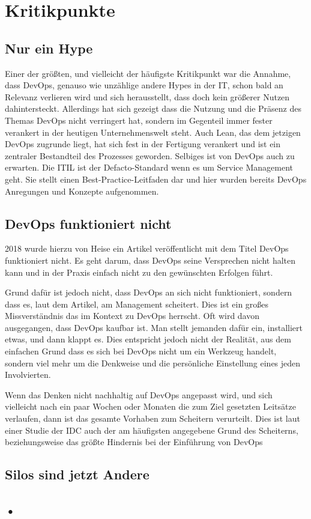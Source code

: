 \section{Kritikpunkte}

\subsection{Nur ein Hype}

Einer der größten, und vielleicht der häufigste Kritikpunkt war die Annahme, dass \ac{DevOps}, genauso wie unzählige andere Hypes in der IT, schon bald an Relevanz verlieren wird und sich herausstellt, dass doch kein größerer Nutzen dahintersteckt. Allerdings hat sich gezeigt dass die Nutzung und die Präsenz des Themas \ac{DevOps} nicht verringert hat, sondern im Gegenteil immer fester verankert in der heutigen Unternehmenswelt steht. Auch Lean, das dem jetzigen \ac{DevOps} zugrunde liegt, hat sich fest in der Fertigung verankert und ist ein zentraler Bestandteil des Prozesses geworden. Selbiges ist von \ac{DevOps} auch zu erwarten. Die \ac{ITIL} ist der Defacto-Standard wenn es um Service Management geht. Sie stellt einen Best-Practice-Leitfaden dar und hier wurden bereits \ac{DevOps} Anregungen und Konzepte aufgenommen.

\subsection{\ac{DevOps} funktioniert nicht}

2018 wurde hierzu von Heise ein Artikel veröffentlicht mit dem Titel \glqq \ac{DevOps} funktioniert nicht\grqq \cite{weiss:2018}. Es geht darum, dass \ac{DevOps} seine Versprechen nicht halten kann und in der Praxis einfach nicht zu den gewünschten Erfolgen führt.

Grund dafür ist jedoch nicht, dass \ac{DevOps} an sich nicht funktioniert, sondern dass es, laut dem Artikel, am Management scheitert. Dies ist ein großes Missverständnis das im Kontext zu \ac{DevOps} herrscht. Oft wird davon ausgegangen, dass \ac{DevOps} kaufbar ist. Man stellt jemanden dafür ein, installiert etwas, und dann klappt es. Dies entspricht jedoch nicht der Realität, aus dem einfachen Grund dass es sich bei \ac{DevOps} nicht um ein Werkzeug handelt, sondern viel mehr um die Denkweise und die persönliche Einstellung eines jeden Involvierten.

Wenn das Denken nicht nachhaltig auf \ac{DevOps} angepasst wird, und sich vielleicht nach ein paar Wochen oder Monaten die zum Ziel gesetzten Leitsätze verlaufen, dann ist das gesamte Vorhaben zum Scheitern verurteilt. Dies ist laut einer Studie der \ac{IDC} \cite{idc:2020} auch der am häufigsten angegebene Grund des Scheiterns, beziehungsweise das größte Hindernis bei der Einführung von \ac{DevOps}

\subsection{Silos sind jetzt Andere}

\subsection{•}
